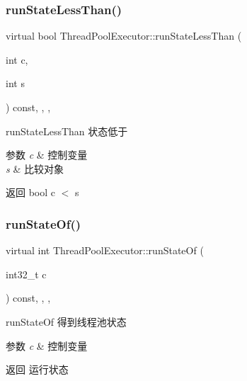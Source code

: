 \subsubsection{\texorpdfstring{run\+State\+Less\+Than()}{runStateLessThan()}}
{\footnotesize\ttfamily virtual bool Thread\+Pool\+Executor\+::run\+State\+Less\+Than (\begin{DoxyParamCaption}\item[{int}]{c,  }\item[{int}]{s }\end{DoxyParamCaption}) const\hspace{0.3cm}{\ttfamily [inline]}, {\ttfamily [final]}, {\ttfamily [protected]}, {\ttfamily [virtual]}}



run\+State\+Less\+Than 状态低于 


\begin{DoxyParams}{参数}
{\em c} & 控制变量 \\
\hline
{\em s} & 比较对象\\
\hline
\end{DoxyParams}
\begin{DoxyReturn}{返回}
bool c $<$ s 
\end{DoxyReturn}
\mbox{\label{classThreadPoolExecutor_acdb626fdcb6ed4c7822508d1e0a3fcf5}} 
\subsubsection{\texorpdfstring{run\+State\+Of()}{runStateOf()}}
{\footnotesize\ttfamily virtual int Thread\+Pool\+Executor\+::run\+State\+Of (\begin{DoxyParamCaption}\item[{int32\+\_\+t}]{c }\end{DoxyParamCaption}) const\hspace{0.3cm}{\ttfamily [inline]}, {\ttfamily [final]}, {\ttfamily [protected]}, {\ttfamily [virtual]}}



run\+State\+Of 得到线程池状态 


\begin{DoxyParams}{参数}
{\em c} & 控制变量\\
\hline
\end{DoxyParams}
\begin{DoxyReturn}{返回}
运行状态 
\end{DoxyReturn}
\mbox{\label{classThreadPoolExecutor_ac5a10d336958ca43530b31bff81c9c4b}} 
